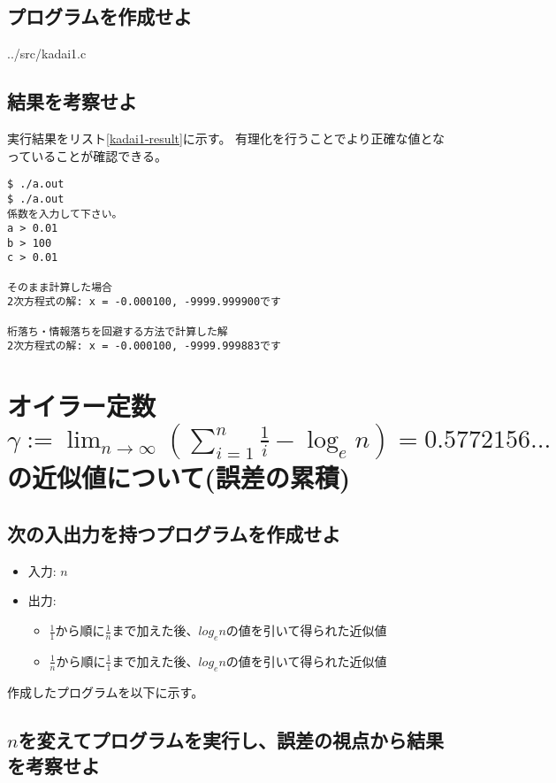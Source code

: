 \documentclass[]{jsarticle}
\begin{document}
\subsection{プログラムを作成せよ}


{../src/kadai1.c}


\subsection{結果を考察せよ}

実行結果をリスト\ref{kadai1-result}に示す。
有理化を行うことでより正確な値となっていることが確認できる。

\begin{lstlisting}[caption=実行結果,label=kadai1-result]
$ ./a.out
$ ./a.out
係数を入力して下さい。
a > 0.01
b > 100
c > 0.01

そのまま計算した場合
2次方程式の解: x = -0.000100, -9999.999900です

桁落ち・情報落ちを回避する方法で計算した解
2次方程式の解: x = -0.000100, -9999.999883です
\end{lstlisting}

\section{オイラー定数$\gamma:=\lim_{n \to \infty} \left(\sum_{i=1}^{n} \frac{1}{i} - \log_{e} n\right)=0.5772156...$の近似値について(誤差の累積)}

\subsection{次の入出力を持つプログラムを作成せよ}

\begin{itemize}
\item 入力: $n$
\item 出力:
\begin{itemize}
\item $\frac{1}{1}$から順に$\frac{1}{n}$まで加えた後、$log_{e} n$の値を引いて得られた近似値
\item $\frac{1}{n}$から順に$\frac{1}{1}$まで加えた後、$log_{e} n$の値を引いて得られた近似値
\end{itemize}
\end{itemize}

作成したプログラムを以下に示す。



\subsection{$n$を変えてプログラムを実行し、誤差の視点から結果を考察せよ}
\end{document}
